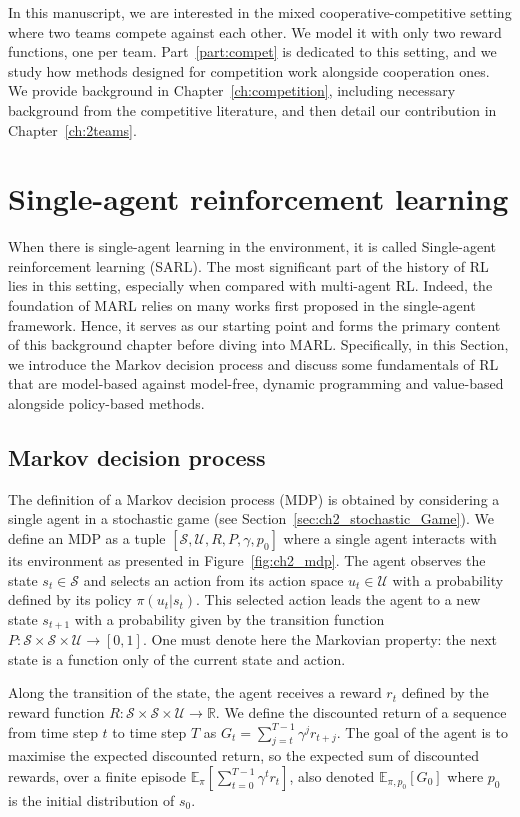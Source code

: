 In this manuscript, we are interested in the mixed cooperative-competitive setting where two teams compete against each other.
We model it with only two reward functions, one per team.
Part~\ref{part:compet} is dedicated to this setting, and we study how methods designed for competition work alongside cooperation ones.
We provide background in Chapter~\ref{ch:competition}, including necessary background from the competitive literature, and then detail our contribution in Chapter~\ref{ch:2teams}.

\section{Single-agent reinforcement learning} 
\label{sec:ch2_single_agent_RL}
When there is single-agent learning in the environment, it is called Single-agent reinforcement learning (SARL).
The most significant part of the history of RL lies in this setting, especially when compared with multi-agent RL.
Indeed, the foundation of MARL relies on many works first proposed in the single-agent framework.
Hence, it serves as our starting point and forms the primary content of this background chapter before diving into MARL.
Specifically, in this Section, we introduce the Markov decision process and discuss some fundamentals of RL that are model-based against model-free, dynamic programming and value-based alongside policy-based methods.

\subsection{Markov decision process}
\label{sec:ch2_mdp}

The definition of a Markov decision process (MDP) is obtained by considering a single agent in a stochastic game (see Section~\ref{sec:ch2_stochastic_Game}).
We define an MDP as a tuple $[\mathcal{S}, \mathcal{U}, R, P, \gamma, p_0]$ where a single agent interacts with its environment as presented in Figure~\ref{fig:ch2_mdp}.
The agent observes the state $s_t \in \mathcal{S}$ and selects an action from its action space $u_t \in \mathcal{U}$ with a probability defined by its policy $\pi(u_t|s_t)$.
This selected action leads the agent to a new state $s_{t+1}$ with a probability given by the transition function $P:\mathcal{S} \times \mathcal{S} \times \mathcal{U} \rightarrow [0,1]$.
One must denote here the Markovian property: the next state is a function only of the current state and action.

Along the transition of the state, the agent receives a reward $r_t$ defined by the reward function $R:\mathcal{S} \times \mathcal{S} \times \mathcal{U} \rightarrow \mathbb{R}$.
We define the discounted return of a sequence from time step $t$ to time step $T$ as $G_t= \sum_{j=t}^{T-1} \gamma^j r_{t+j}$.
The goal of the agent is to maximise the expected discounted return, so the expected sum of discounted rewards, over a finite episode $\mathbb{E}_{\pi} \left[\sum_{t=0}^{T-1} \gamma^t r_t \right]$, also denoted $\mathbb{E}_{\pi, p_0}\left[ G_0 \right]$ where $p_0$ is the initial distribution of $s_0$.

